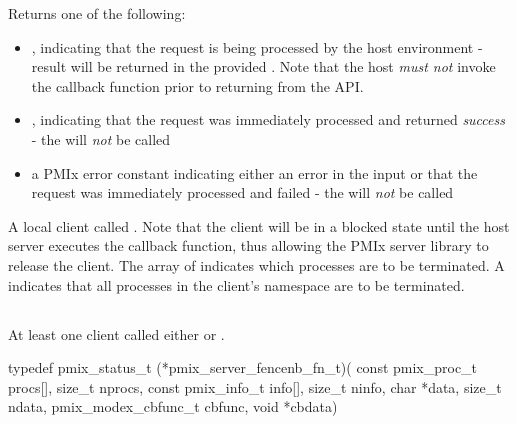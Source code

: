 Returns one of the following:

\begin{itemize}
    \item {}, indicating that the request is being processed by the host environment - result will be returned in the provided . Note that the host \emph{must not} invoke the callback function prior to returning from the \ac{API}.
    \item {}, indicating that the request was immediately processed and returned \textit{success} - the  will \textit{not} be called
    \item a PMIx error constant indicating either an error in the input or that the request was immediately processed and failed - the  will \textit{not} be called
\end{itemize}

\descr

A local client called .
Note that the client will be in a blocked state until the host server executes the callback function, thus allowing the \ac{PMIx} server library to release the client.
The array of  indicates which processes are to be terminated.
A  indicates that all processes in the client's namespace are to be terminated.


\subsection{}

\summary

At least one client called either  or .

\format

\cspecificstart
\begin{codepar}
typedef pmix_status_t (*pmix_server_fencenb_fn_t)(
                             const pmix_proc_t procs[],
                             size_t nprocs,
                             const pmix_info_t info[],
                             size_t ninfo,
                             char *data, size_t ndata,
                             pmix_modex_cbfunc_t cbfunc,
                             void *cbdata)
\end{codepar}
\cspecificend

\begin{arglist}
\end{arglist}

